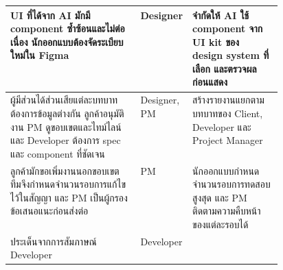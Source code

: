 \begin{xltabular}{\linewidth}{|>{\RaggedRight\arraybackslash}X|>{\RaggedRight\arraybackslash}p{0.13\linewidth}|>{\RaggedRight\arraybackslash}p{0.33\linewidth}|}
  UI ที่ได้จาก AI มักมี component ซ้ำซ้อนและไม่ต่อเนื่อง นักออกแบบต้องจัดระเบียบใหม่ใน Figma & Designer & จำกัดให้ AI ใช้ component จาก UI kit ของ design system ที่เลือก และตรวจผลก่อนแสดง \\ \hline
  ผู้มีส่วนได้ส่วนเสียแต่ละบทบาทต้องการข้อมูลต่างกัน ลูกค้าอนุมัติงาน PM ดูขอบเขตและไทม์ไลน์ และ Developer ต้องการ spec และ component ที่ชัดเจน & Designer, PM & สร้างรายงานแยกตามบทบาทของ Client, Developer และ Project Manager \\ \hline
  ลูกค้ามักขอเพิ่มงานนอกขอบเขต ทีมจึงกำหนดจำนวนรอบการแก้ไขไว้ในสัญญา และ PM เป็นผู้กรองข้อเสนอแนะก่อนส่งต่อ & PM & นักออกแบบกำหนดจำนวนรอบการทดสอบสูงสุด และ PM ติดตามความคืบหน้าของแต่ละรอบได้ \\ \hline
  ประเด็นจากการสัมภาษณ์ Developer & Developer &  \\ \hline
\end{xltabular}
\endgroup
